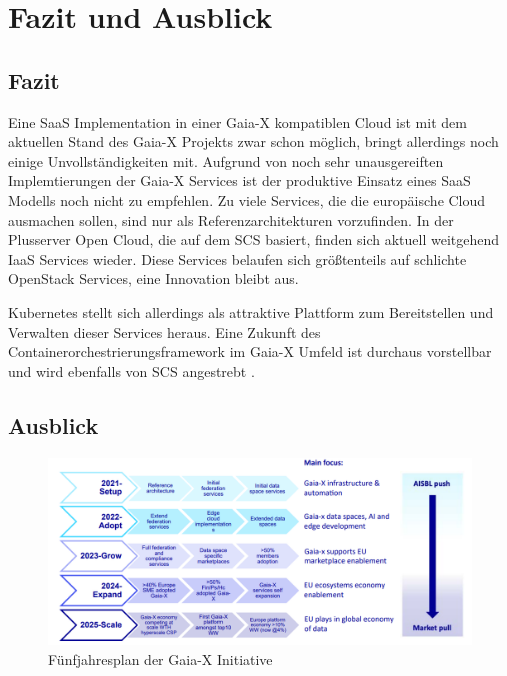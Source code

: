 \chapter{Fazit und Ausblick}
\label{chapter:fazit}

\section{Fazit}
\label{sec:fazit_ausblick:fazit}

Eine \ac{SaaS} Implementation in einer Gaia-X kompatiblen Cloud ist mit dem aktuellen Stand des Gaia-X Projekts zwar schon 
möglich, bringt allerdings noch einige Unvollständigkeiten mit.
Aufgrund von noch sehr unausgereiften Implemtierungen der Gaia-X Services ist der produktive Einsatz eines \ac{SaaS}
Modells noch nicht zu empfehlen. 
Zu viele Services, die die europäische Cloud ausmachen sollen, sind nur als Referenzarchitekturen vorzufinden.
In der Plusserver Open Cloud, die auf dem \acf{SCS} basiert, finden sich aktuell weitgehend \ac{IaaS} Services wieder.
Diese Services belaufen sich größtenteils auf schlichte OpenStack Services, eine Innovation bleibt aus.

Kubernetes stellt sich allerdings als attraktive Plattform zum Bereitstellen und Verwalten dieser Services heraus.
Eine Zukunft des Containerorchestrierungsframework im Gaia-X Umfeld ist durchaus vorstellbar und wird ebenfalls von \ac{SCS}
angestrebt \cite{scs}.

\section{Ausblick}
\label{sec:fazit_ausblick:fazit}

\begin{figure}[h]
  \centering
  \includegraphics[width=1.1\textwidth]{gfx/chapters/6_fazit_ausblick/gaia-x-ausblick.png}
  \caption{Fünfjahresplan der Gaia-X Initiative}
  \label{fig:gaia-x-ausblick}
\end{figure}

